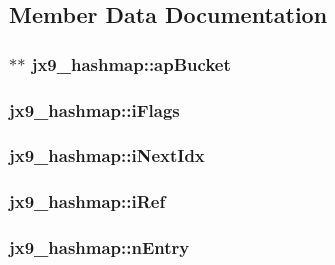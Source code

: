 \subsection{Member Data Documentation}
\hypertarget{structjx9__hashmap_a0841e7039abe953ac68f427e3af2a879}{
\subsubsection[{ap\-Bucket}]{$\ast$$\ast$ jx9\-\_\-hashmap\-::ap\-Bucket}}\label{da/d5e/structjx9__hashmap_a0841e7039abe953ac68f427e3af2a879}
\hypertarget{structjx9__hashmap_ab7527474f3ea969ed87e358440fe7893}{
\subsubsection[{i\-Flags}]{ jx9\-\_\-hashmap\-::i\-Flags}}\label{da/d5e/structjx9__hashmap_ab7527474f3ea969ed87e358440fe7893}
\hypertarget{structjx9__hashmap_ac5f553174cd5ca3932596b327eaad0b5}{
\subsubsection[{i\-Next\-Idx}]{ jx9\-\_\-hashmap\-::i\-Next\-Idx}}\label{da/d5e/structjx9__hashmap_ac5f553174cd5ca3932596b327eaad0b5}
\hypertarget{structjx9__hashmap_a96fc8363536e741de813e1b425ceb853}{
\subsubsection[{i\-Ref}]{ jx9\-\_\-hashmap\-::i\-Ref}}\label{da/d5e/structjx9__hashmap_a96fc8363536e741de813e1b425ceb853}
\hypertarget{structjx9__hashmap_a158005676f92744f199c5f0b2bbfb2d4}{
\subsubsection[{n\-Entry}]{ jx9\-\_\-hashmap\-::n\-Entry}}\label{da/d5e/structjx9__hashmap_a158005676f92744f199c5f0b2bbfb2d4}
